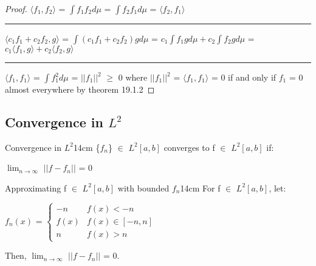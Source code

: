     \begin{proof}
        $\langle f_1,f_2 \rangle$
        = $\int f_1f_2 d\mu$
        = $\int f_2f_1 d\mu$
        = $\langle f_2,f_1 \rangle$

        \rule[0.1cm]{15.2cm}{0.01cm}

        $\langle c_1f_1 + c_2f_2 , g \rangle$
        = $\int (c_1f_1 + c_2f_2)g d\mu$
        = $c_1\int f_1g d\mu + c_2\int f_2g d\mu$
        = $c_1 \langle f_1,g \rangle + c_2 \langle f_2,g \rangle$

        \rule[0.1cm]{15.2cm}{0.01cm}

        $\langle f_1,f_1 \rangle$
        = $\int f_1^2 d\mu$
        = $||f_1||^2$ $\geq$ 0
        where $||f_1||^2$ = $\langle f_1,f_1 \rangle$ = 0
        if and only if $f_1$ = 0 almost everywhere
        by {\color{red} theorem 19.1.2}
    \end{proof}

    \newpage





\subsection{ Convergence in $L^2$ }

    \begin{definition}{Convergence in $L^2$}{14cm}
        \{$f_n$\} $\in$ $L^2[a,b]$ converges to f $\in$ $L^2[a,b]$ if:

        \hspace{0.5cm}
        $\lim_{n \rightarrow \infty}$ $||f - f_n||$ = 0
    \end{definition}

    \vspace{0.5cm}



    \begin{wtheorem}{Approximating f $\in$ $L^2[a,b]$ with bounded $f_n$}{14cm}
        For f $\in$ $L^2[a,b]$, let:

        \hspace{0.5cm}
        $f_n(x)$ =
        $\begin{cases}
            -n & f(x) < -n \\
            f(x) & f(x) \in [-n,n] \\
            n & f(x) > n
        \end{cases}$

        Then, $\lim_{n \rightarrow \infty}$ $||f - f_n||$ = 0.
    \end{wtheorem}

